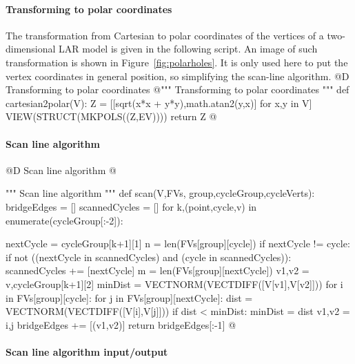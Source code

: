 \documentclass[11pt,oneside]{article}	%
\begin{document}
\paragraph{Transforming to polar coordinates}

The transformation from Cartesian to polar coordinates of the vertices of a two-dimensional LAR model is given in the following script. An image of such transformation is shown in Figure~\ref{fig:polarholes}. It is only used here to put the vertex coordinates in general position, so simplifying the scan-line algorithm.
@D Transforming to polar coordinates 
@{""" Transforming to polar coordinates """
def cartesian2polar(V):    
    Z = [[sqrt(x*x + y*y),math.atan2(y,x)] for x,y in V]
    VIEW(STRUCT(MKPOLS((Z,EV))))
    return Z
@}


\paragraph{Scan line algorithm}
@D Scan line algorithm 
@{""" Scan line algorithm """
def scan(V,FVs, group,cycleGroup,cycleVerts):
    bridgeEdges = []
    scannedCycles = []
    for k,(point,cycle,v) in enumerate(cycleGroup[:-2]):
    	
        nextCycle = cycleGroup[k+1][1]
        n = len(FVs[group][cycle])
        if nextCycle != cycle: 
            if not ((nextCycle in scannedCycles) and (cycle in scannedCycles)):
                scannedCycles += [nextCycle]
                m = len(FVs[group][nextCycle])
                v1,v2 = v,cycleGroup[k+1][2]
                minDist = VECTNORM(VECTDIFF([V[v1],V[v2]]))
                for i in FVs[group][cycle]:
                    for j in FVs[group][nextCycle]:
                        dist = VECTNORM(VECTDIFF([V[i],V[j]]))
                        if  dist < minDist: 
                            minDist = dist
                            v1,v2 = i,j
                bridgeEdges += [(v1,v2)]
    return bridgeEdges[:-1]
@}

\paragraph{Scan line algorithm input/output}
\end{document}

